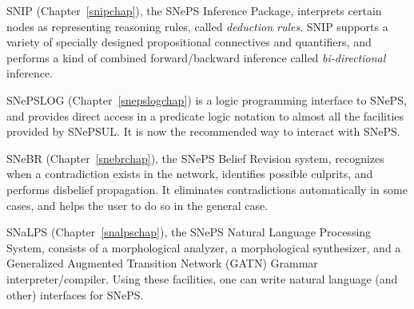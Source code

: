 \documentclass{book}
\begin{document}
SNIP (Chapter~\ref{snipchap}), the SNePS Inference Package, interprets
certain nodes as representing reasoning rules, called {\em deduction
rules}.  SNIP supports a variety of specially designed propositional
connectives and quantifiers, and performs a kind of combined
forward/backward inference called {\em bi-directional} inference.

SNePSLOG (Chapter~\ref{snepslogchap}) is a logic programming interface
to SNePS, and provides direct access in a predicate logic notation to
almost all the facilities provided by SNePSUL.  It is now the
recommended way to interact with SNePS.

SNeBR (Chapter~\ref{snebrchap}), the SNePS Belief Revision system,
recognizes when a contradiction exists in the network, identifies
possible culprits, and performs disbelief propagation.  It eliminates
contradictions automatically in some cases, and helps the user to do
so in the general case.

SNaLPS (Chapter~\ref{snalpschap}), the SNePS Natural Language
Processing System, consists of a morphological analyzer, a
morphological synthesizer, and a Generalized Augmented Transition
Network (GATN) Grammar interpreter/compiler.  Using these facilities,
one can write natural language (and other) interfaces for SNePS.
\end{document}
